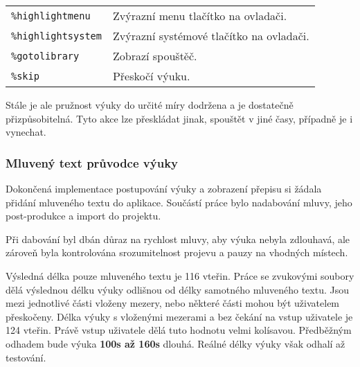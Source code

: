 \begin{longtable}[]{@{}ll@{}}
\begin{minipage}[t]{0.05\columnwidth}
\texttt{\%highlightmenu}\strut
\end{minipage} & \begin{minipage}[t]{0.05\columnwidth}\raggedright\strut
Zvýrazní menu tlačítko na ovladači.\strut
\end{minipage}\tabularnewline
\begin{minipage}[t]{0.05\columnwidth}\raggedright\strut
\texttt{\%highlightsystem}\strut
\end{minipage} & \begin{minipage}[t]{0.05\columnwidth}\raggedright\strut
Zvýrazní systémové tlačítko na ovladači.\strut
\end{minipage}\tabularnewline
\begin{minipage}[t]{0.05\columnwidth}\raggedright\strut
\texttt{\%gotolibrary}\strut
\end{minipage} & \begin{minipage}[t]{0.05\columnwidth}\raggedright\strut
Zobrazí spouštěč.\strut
\end{minipage}\tabularnewline
\begin{minipage}[t]{0.05\columnwidth}\raggedright\strut
\texttt{\%skip}\strut
\end{minipage} & \begin{minipage}[t]{0.05\columnwidth}\raggedright\strut
Přeskočí výuku.\strut
\end{minipage}\tabularnewline
\bottomrule
\end{longtable}

Stále je ale pružnost výuky do určité míry dodržena a je dostatečně
přizpůsobitelná. Tyto akce lze přeskládat jinak, spouštět v jiné časy,
případně je i vynechat.

\subsubsection{Mluvený text průvodce
výuky}\label{mluvenuxfd-text-prux16fvodce-vuxfduky}

Dokončená implementace postupování výuky a zobrazení přepisu si žádala
přidání mluveného textu do aplikace. Součástí práce bylo nadabování
mluvy, jeho post-produkce a import do projektu.

Při dabování byl dbán důraz na rychlost mluvy, aby výuka nebyla
zdlouhavá, ale zároveň byla kontrolována srozumitelnost projevu a pauzy
na vhodných místech.

Výsledná délka pouze mluveného textu je 116 vteřin. Práce se zvukovými
soubory dělá výslednou délku výuky odlišnou od délky samotného mluveného
textu. Jsou mezi jednotlivé části vloženy mezery, nebo některé části
mohou být uživatelem přeskočeny. Délka výuky s vloženými mezerami a bez
čekání na vstup uživatele je 124 vteřin. Právě vstup uživatele dělá tuto
hodnotu velmi kolísavou. Předběžným odhadem bude výuka \textbf{100s až
160s} dlouhá. Reálné délky výuky však odhalí až testování.

